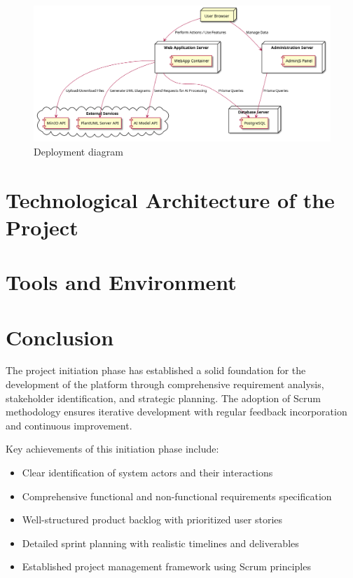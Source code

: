 \begin{figure}[H]
    \centering
    \includegraphics[width=\textwidth]{./diagrams/deployment/d2.png}
    \caption{Deployment diagram}
    \label{fig:deployment}
\end{figure}

\section{Technological Architecture of the Project}

\section{Tools and Environment}

\section{Conclusion}

The project initiation phase has established a solid foundation for the development of the platform through comprehensive requirement analysis, stakeholder identification, and strategic planning. The adoption of Scrum methodology ensures iterative development with regular feedback incorporation and continuous improvement.

Key achievements of this initiation phase include:
\begin{itemize}
    \item Clear identification of system actors and their interactions
    \item Comprehensive functional and non-functional requirements specification
    \item Well-structured product backlog with prioritized user stories
    \item Detailed sprint planning with realistic timelines and deliverables
    \item Established project management framework using Scrum principles
\end{itemize}

